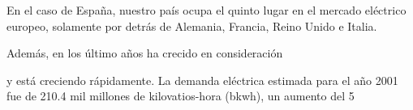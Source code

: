 En el caso de España, nuestro país ocupa el quinto lugar en el mercado eléctrico europeo, solamente por detrás de Alemania, Francia, Reino Unido e Italia. 


Además, en los último años ha crecido en consideración 

y está creciendo rápidamente. La demanda eléctrica estimada para el año 2001 fue de 210.4 mil millones de kilovatios-hora (bkwh), un aumento del 5%



\cite{spain}

\vspace{3mm}

